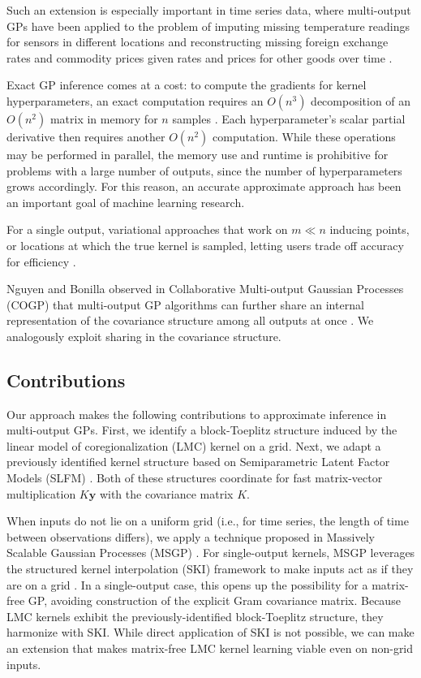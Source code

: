 \documentclass{article}
\def\Ty{\textbf{y}}
\begin{document}
Such an extension is especially important in time series data, where multi-output GPs have been applied to the problem of imputing missing temperature readings for sensors in different locations and reconstructing missing foreign exchange rates and commodity prices given rates and prices for other goods over time \cite{osborne2008towards, alvarez2010efficient}.

Exact GP inference comes at a cost: to compute the gradients for kernel hyperparameters, an exact computation requires an $O(n^3)$ decomposition of an $O(n^2)$ matrix in memory for $n$ samples \cite{gpml}. Each hyperparameter's scalar partial derivative then requires another $O(n^2)$ computation. While these operations may be performed in parallel, the memory use and runtime is prohibitive for problems with a large number of outputs, since the number of hyperparameters grows accordingly. For this reason, an accurate approximate approach has been an important goal of machine learning research.

For a single output, variational approaches that work on $m\ll n$ inducing points, or locations at which the true kernel is sampled, letting users trade off accuracy for efficiency \cite{hensman2013gaussian}.

Nguyen and Bonilla observed in Collaborative Multi-output Gaussian Processes (COGP) that multi-output GP algorithms can further share an internal representation of the covariance structure among all outputs at once . We analogously exploit sharing in the covariance structure.

\subsection{Contributions}

Our approach makes the following contributions to approximate inference in multi-output GPs. First, we identify a block-Toeplitz structure induced by the linear model of coregionalization (LMC) kernel on a grid. Next, we adapt a previously identified kernel structure based on Semiparametric Latent Factor Models (SLFM) \cite{seeger2005semiparametric}. Both of these structures coordinate for fast matrix-vector multiplication $K\Ty$ with the covariance matrix $K$.

When inputs do not lie on a uniform grid (i.e., for time series, the length of time between observations differs), we apply a technique proposed in Massively Scalable Gaussian Processes (MSGP) \cite{msgp}. For single-output kernels, MSGP leverages the structured kernel interpolation (SKI) framework to make inputs act as if they are on a grid \cite{kiss-gp}. In a single-output case, this opens up the possibility for a matrix-free GP, avoiding construction of the explicit Gram covariance matrix. Because LMC kernels exhibit the previously-identified block-Toeplitz structure, they harmonize with SKI. While direct application of SKI is not possible, we can make an extension that makes matrix-free LMC kernel learning viable even on non-grid inputs.
\end{document}

